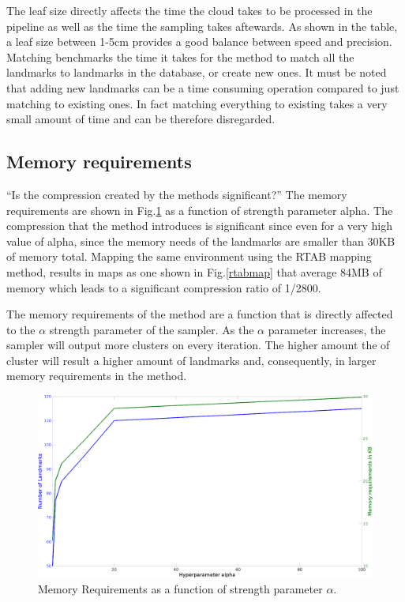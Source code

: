 \documentclass[twoside,hidelinks]{article}
\begin{document}
The leaf size directly affects the time the cloud takes to be processed in the pipeline as well as the time the sampling takes aftewards. As shown in the table, a leaf size between 1-5cm provides a good balance between speed and precision. Matching benchmarks the time it takes for the method to match all the landmarks to landmarks in the database, or create new ones. It must be noted that adding new landmarks can be a time consuming operation compared to just matching to existing ones. In fact matching everything to existing takes a very small amount of time and can be therefore disregarded.

\subsection{Memory requirements}
\label{reqs}
``Is the compression created by the methods significant?''
The memory requirements are shown in Fig.\ref{memReq} as a function of strength parameter alpha. The compression that the method introduces is significant since even for a very high value of alpha, since the memory needs of the landmarks are smaller than 30KB of memory total. Mapping the same environment using the RTAB mapping method, results in maps  as one shown in Fig.\ref{rtabmap} that average 84MB of memory which leads to a significant compression ratio of 1/2800.

The memory requirements of the method are a function that is directly affected to the $\alpha$ strength parameter of the sampler. As the $\alpha$ parameter increases, the sampler will output more clusters on every iteration. The higher amount the of cluster will result a higher amount of landmarks and, consequently, in larger memory requirements in the method.

\begin{figure}[ht!]
  \centering
    \includegraphics[width=.8\textwidth]{memoryRequirements2}
    \caption{Memory Requirements as a function of strength parameter $\alpha$.}
  \label{memReq}
\end{figure}
\end{document}
